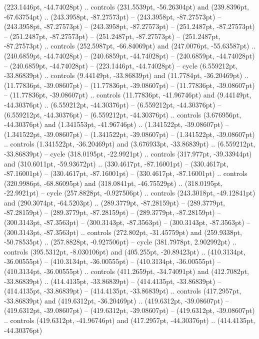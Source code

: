 (223.1446pt, -44.74028pt) .. controls (231.5539pt, -56.26304pt) and (239.8396pt, -67.63754pt) .. (243.3958pt, -87.27573pt)
 -- (243.3958pt, -87.27573pt)
 -- (243.3958pt, -87.27573pt)
 -- (243.3958pt, -87.27573pt)
 -- (251.2487pt, -87.27573pt)
 -- (251.2487pt, -87.27573pt)
 -- (251.2487pt, -87.27573pt)
 -- (251.2487pt, -87.27573pt) .. controls (252.5987pt, -66.84069pt) and (247.0076pt, -55.63587pt) .. (240.6859pt, -44.74028pt)
 -- (240.6859pt, -44.74028pt)
 -- (240.6859pt, -44.74028pt)
 -- (240.6859pt, -44.74028pt)
 -- (223.1446pt, -44.74028pt) -- cycle
(6.559212pt, -33.86839pt) .. controls (9.44149pt, -33.86839pt) and (11.7784pt, -36.20469pt) .. (11.77836pt, -39.08607pt)
 -- (11.77836pt, -39.08607pt)
 -- (11.77836pt, -39.08607pt)
 -- (11.77836pt, -39.08607pt) .. controls (11.77836pt, -41.96746pt) and (9.44149pt, -44.30376pt) .. (6.559212pt, -44.30376pt)
 -- (6.559212pt, -44.30376pt)
 -- (6.559212pt, -44.30376pt)
 -- (6.559212pt, -44.30376pt) .. controls (3.676956pt, -44.30376pt) and (1.341553pt, -41.96746pt) .. (1.341522pt, -39.08607pt)
 -- (1.341522pt, -39.08607pt)
 -- (1.341522pt, -39.08607pt)
 -- (1.341522pt, -39.08607pt) .. controls (1.341522pt, -36.20469pt) and (3.676933pt, -33.86839pt) .. (6.559212pt, -33.86839pt) -- cycle
(318.0195pt, -22.9921pt) .. controls (317.977pt, -39.33944pt) and (310.6011pt, -59.93672pt) .. (330.4617pt, -87.16001pt)
 -- (330.4617pt, -87.16001pt)
 -- (330.4617pt, -87.16001pt)
 -- (330.4617pt, -87.16001pt) .. controls (320.9986pt, -68.86095pt) and (318.0841pt, -46.75529pt) .. (318.0195pt, -22.9921pt) -- cycle
(257.8828pt, -0.927506pt) .. controls (243.3018pt, -49.12841pt) and (290.3074pt, -64.5203pt) .. (289.3779pt, -87.28159pt)
 -- (289.3779pt, -87.28159pt)
 -- (289.3779pt, -87.28159pt)
 -- (289.3779pt, -87.28159pt)
 -- (300.3143pt, -87.3563pt)
 -- (300.3143pt, -87.3563pt)
 -- (300.3143pt, -87.3563pt)
 -- (300.3143pt, -87.3563pt) .. controls (272.802pt, -31.45759pt) and (259.9338pt, -50.78535pt) .. (257.8828pt, -0.927506pt) -- cycle
(381.7978pt, 2.902992pt) .. controls (395.5312pt, -8.030106pt) and (405.255pt, -20.89423pt) .. (410.3134pt, -36.00555pt)
 -- (410.3134pt, -36.00555pt)
 -- (410.3134pt, -36.00555pt)
 -- (410.3134pt, -36.00555pt) .. controls (411.2659pt, -34.74091pt) and (412.7082pt, -33.86839pt) .. (414.4135pt, -33.86839pt)
 -- (414.4135pt, -33.86839pt)
 -- (414.4135pt, -33.86839pt)
 -- (414.4135pt, -33.86839pt) .. controls (417.2957pt, -33.86839pt) and (419.6312pt, -36.20469pt) .. (419.6312pt, -39.08607pt)
 -- (419.6312pt, -39.08607pt)
 -- (419.6312pt, -39.08607pt)
 -- (419.6312pt, -39.08607pt) .. controls (419.6312pt, -41.96746pt) and (417.2957pt, -44.30376pt) .. (414.4135pt, -44.30376pt)
